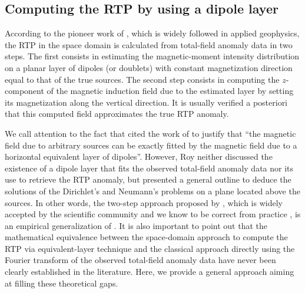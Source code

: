 \subsection{Computing the RTP by using a dipole layer}


According to the pioneer work of \cite{silva1986}, which is widely followed in applied geophysics, 
the RTP in the space domain is calculated from total-field anomaly data in two steps.
The first consists in estimating the magnetic-moment intensity distribution on a planar layer 
of dipoles (or doublets) with constant magnetization direction equal to that of the true sources.
The second step consists in computing the $z$-component of the magnetic induction field due 
to the estimated layer by setting its magnetization along the vertical direction.
It is usually verified a posteriori that this computed field approximates the true RTP anomaly.

We call attention to the fact that \cite{silva1986} cited the work of \cite{roy1962} to justify that ``the magnetic 
field due to arbitrary sources can be exactly fitted by the magnetic field due to a horizontal equivalent
layer of dipoles''. 
However, Roy neither discussed the existence of a dipole layer that fits the observed total-field 
anomaly data nor its use to retrieve the RTP anomaly, but 
presented a general outline to deduce the solutions of the Dirichlet's and Neumann's problems on a plane 
located above the sources.
In other words, the two-step approach proposed by \cite{silva1986}, which is widely accepted by the scientific community 
and we know to be correct from practice 
\citep[e.g.,][]{leao-silva_1989, guspi_novara2009, oliveirajr_etal2013, li_etal2014, reis_etal2020, takahashi-etal2022, piauilino_etal2025}, 
is an empirical generalization of \cite{roy1962}. 
It is also important to point out that the mathematical equivalence between the space-domain approach to compute the 
RTP via equivalent-layer technique and the classical approach directly using the Fourier transform of the observed 
total-field anomaly data \citep[e.g.,][p. 331]{blakely1996} have never been clearly established in the literature.
Here, we provide a general approach aiming at filling these theoretical gaps.

